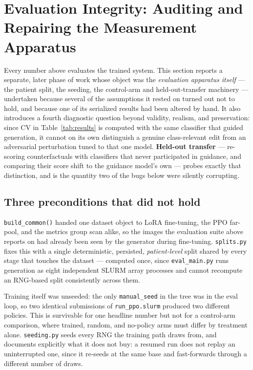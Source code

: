 \documentclass[11pt]{article}
\begin{document}
\section{Evaluation Integrity: Auditing and Repairing the Measurement Apparatus}
\label{sec:integrity}

Every number above evaluates the trained system. This section reports a
separate, later phase of work whose object was the \emph{evaluation
apparatus itself} — the patient split, the seeding, the control-arm and
held-out-transfer machinery — undertaken because several of the assumptions
it rested on turned out not to hold, and because one of its serialized
results had been altered by hand. It also introduces a fourth diagnostic
question beyond validity, realism, and preservation: since CV in
Table~\ref{tab:results} is computed with the same classifier that guided
generation, it cannot on its own distinguish a genuine class-relevant edit
from an adversarial perturbation tuned to that one model. \textbf{Held-out
transfer} — re-scoring counterfactuals with classifiers that never
participated in guidance, and comparing their score shift to the guidance
model's own — probes exactly that distinction, and is the quantity two of
the bugs below were silently corrupting.

\subsection{Three preconditions that did not hold}

\texttt{build\_common()} handed one dataset object to LoRA fine-tuning, the
PPO far-pool, and the metrics group scan alike, so the images the
evaluation suite above reports on had already been seen by the generator
during fine-tuning. \texttt{splits.py} fixes this with a single
deterministic, persisted, \emph{patient-level} split shared by every stage
that touches the dataset — computed once, since \texttt{eval\_main.py} runs
generation as eight independent SLURM array processes and cannot recompute
an RNG-based split consistently across them.

Training itself was unseeded: the only \texttt{manual\_seed} in the tree
was in the eval loop, so two identical submissions of \texttt{run\_ppo.slurm}
produced two different policies. This is survivable for one headline
number but not for a control-arm comparison, where trained, random, and
no-policy arms must differ by treatment alone. \texttt{seeding.py} seeds
every RNG the training path draws from, and documents explicitly what it
does not buy: a resumed run does not replay an uninterrupted one, since it
re-seeds at the same base and fast-forwards through a different number of
draws.
\end{document}
